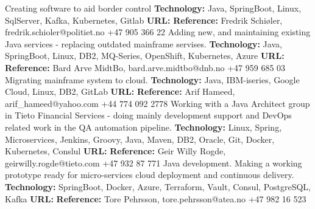 \documentclass[11pt,a4paper,sans]{moderncv} %
\begin{document}
{
Creating software to aid border control
\newline{}\textbf{Technology:}
Java, SpringBoot, Linux, SqlServer, Kafka, Kubernetes, Gitlab
\newline{}\textbf{URL:} 
\newline{}\textbf{Reference:} Fredrik Schiøler, fredrik.schioler@politiet.no +47 905 366 22
}
{
Adding new, and maintaining existing Java services - replacing outdated mainframe servises.
\newline{}\textbf{Technology:}
Java, SpringBoot, Linux, DB2, MQ-Series, OpenShift, Kubernetes, Azure
\newline{}\textbf{URL:} 
\newline{}\textbf{Reference:} Bard Arve MidtBo, bard.arve.midtbo@dnb.no +47 959 685 03
}
{
Migrating mainframe system to cloud.
\newline{}\textbf{Technology:}
Java, IBM-iseries, Google Cloud, Linux, DB2, GitLab
\newline{}\textbf{URL:} \httplink{}
\newline{}\textbf{Reference:} Arif Hameed, arif\_hameed@yahoo.com +44 774 092 2778
}
{
Working with a Java Architect group in Tieto Financial Services - doing mainly development support and DevOps related work in the QA automation pipeline.
\newline{}\textbf{Technology:}
Linux, Spring, Microservices, Jenkins, Groovy, Java, Maven, DB2, Oracle, Git, Docker, Kubernetes, Conslul
\newline{}\textbf{URL:} 
\newline{}\textbf{Reference:} Geir Willy Rogde, geirwilly.rogde@tieto.com +47 932 87 771
}
{
Java development. Making a working prototype ready for micro-services cloud deployment and continuous delivery.
\newline{}\textbf{Technology:}
SpringBoot, Docker, Azure, Terraform, Vault, Consul, PostgreSQL, Kafka
\newline{}\textbf{URL:} 
\newline{}\textbf{Reference:} Tore Pehrsson, tore.pehrsson@atea.no +47 982 16 523
}
\end{document}

